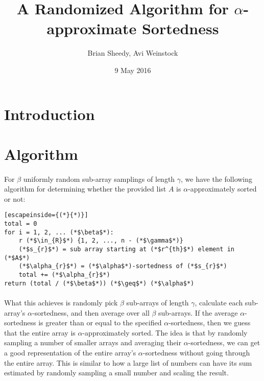 \documentclass{article}
\title{A Randomized Algorithm for $\alpha$-approximate Sortedness}
\date{9 May 2016}
\author{Brian Sheedy, Avi Weinstock}
\begin{document}
\maketitle{}
\section{Introduction}
\section{Algorithm}
\paragraph{}For $\beta$ uniformly random sub-array samplings of length $\gamma$, we have the following algorithm for determining whether the provided list $A$ is $\alpha$-approximately sorted or not:
\begin{lstlisting}[escapeinside={(*}{*)}]
total = 0
for i = 1, 2, ... (*$\beta$*):
    r (*$\in_{R}$*) {1, 2, ..., n - (*$\gamma$*)}
    (*$s_{r}$*) = sub array starting at (*$r^{th}$*) element in (*$A$*)
    (*$\alpha_{r}$*) = (*$\alpha$*)-sortedness of (*$s_{r}$*)
    total += (*$\alpha_{r}$*)
return (total / (*$\beta$*)) (*$\geq$*) (*$\alpha$*)
\end{lstlisting}
\paragraph{}What this achieves is randomly pick $\beta$ sub-arrays of length $\gamma$, calculate each sub-array's $\alpha$-sortedness, and then average over all $\beta$ sub-arrays. If the average $\alpha$-sortedness is greater than or equal to the specified $\alpha$-sortedness, then we guess that the entire array is $\alpha$-approximately sorted.
The idea is that by randomly sampling a number of smaller arrays and averaging their $\alpha$-sortedness, we can get a good representation of the entire array's $\alpha$-sortedness without going through the entire array. This is similar to how a large list of numbers can have its sum estimated by randomly sampling a small number and scaling the result.
\end{document}

